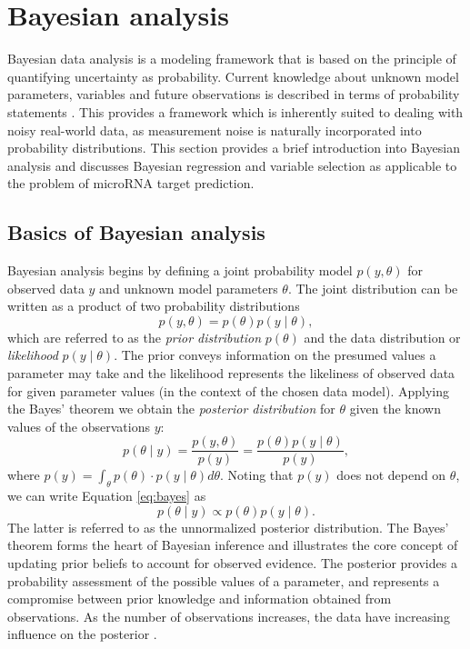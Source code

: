 
\section{Bayesian analysis}\label{bayesian-analysis}

Bayesian data analysis is a modeling framework that is based on the principle
of quantifying uncertainty as probability. Current knowledge about unknown
model parameters, variables and future observations is described in terms of
probability statements \citep{Gelman2013}. This provides a framework which is
inherently suited to dealing with noisy real-world data, as measurement noise
is naturally incorporated into probability distributions. This section
provides a brief introduction into Bayesian analysis and discusses Bayesian
regression and variable selection as applicable to the problem of microRNA
target prediction.




\subsection{Basics of Bayesian analysis}

Bayesian analysis begins by defining a joint probability model $p(y,\theta)$
for observed data $y$ and unknown model parameters $\theta$.
The joint distribution can be written as a product of two probability distributions
\begin{equation}
  p(y,\theta) = p(\theta) p(y\mid\theta),
\end{equation}
which are referred to as the \emph{prior distribution} $p(\theta)$ and the
data distribution or \emph{likelihood} $p(y\mid\theta)$. The prior conveys
information on the presumed values a parameter may take and the likelihood
represents the likeliness of observed data for given parameter values (in the
context of the chosen data model). Applying the Bayes' theorem we obtain the
\emph{posterior distribution} for $\theta$ given the known values of the
observations $y$:
\begin{equation}
  \label{eq:bayes}
  p(\theta \mid y) = \frac{p(y,\theta)}{p(y)} = \frac{p(\theta) p(y\mid\theta)}{p(y)},
\end{equation}
where $p(y) = \int_{\theta} p(\theta) \cdot p(y\mid\theta) d\theta$.
Noting that $p(y)$ does not depend on $\theta$, we can write Equation
\eqref{eq:bayes} as
\begin{equation}
  p(\theta \mid y) \propto p(\theta) p(y\mid\theta).
\end{equation}
The latter is referred to as the unnormalized posterior distribution. The
Bayes' theorem forms the heart of Bayesian inference and illustrates the core
concept of updating prior beliefs to account for observed evidence. The
posterior provides a probability assessment of the possible values of
a parameter, and represents a compromise between prior knowledge and information
obtained from observations. As the number of observations increases, the
data have increasing influence on the posterior \citep{Gelman2013}.

